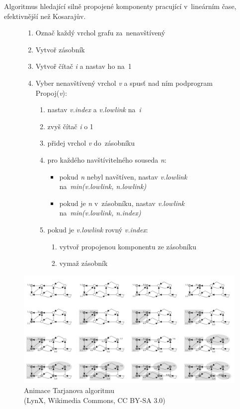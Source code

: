 Algoritmus hledající silně propojené komponenty pracující v~lineárním čase, efektivnější než Kosarajův.

\begin{figure}[ht]
\onehalfspacing
\begin{enumerate}
\item Označ každý vrchol grafu za~nenavštívený
\item Vytvoř zásobník
\item Vytvoř čítač \emph{i} a nastav ho na~1
\item Vyber nenavštívený vrchol \emph{v} a spusť nad ním podprogram Propoj(\emph{v}):
    \begin{enumerate}
    \item nastav \emph{v.index} a \emph{v.lowlink} na~\emph{i}
    \item zvyš čítač \emph{i} o 1
    \item přidej vrchol \emph{v} do~zásobníku
    \item pro každého navštívitelného souseda \emph{n}:
        \begin{itemize}
        \item pokud \emph{n} nebyl navštíven, nastav \emph{v.lowlink} na~\emph{min(v.lowlink, n.lowlink)}
        \item pokud je \emph{n} v~zásobníku, nastav \emph{v.lowlink} na~\emph{min(v.lowlink, n.index)}
        \end{itemize}
    \item pokud je \emph{v.lowlink} rovný \emph{v.index}:
        \begin{enumerate}
        \item vytvoř propojenou komponentu ze zásobníku
        \item vymaž zásobník
        \end{enumerate}
    \end{enumerate}
\end{enumerate}
\end{figure}
\FloatBarrier

\begin{figure}[ht]
\centering
\includegraphics[width=\textwidth]{images/3_tarjanuv-algoritmus-animace.png}

\caption[Animace Tarjanova algoritmu]{Animace Tarjanova algoritmu\\{\small (LynX, Wikimedia Commons, CC BY-SA 3.0)}}
\end{figure}

